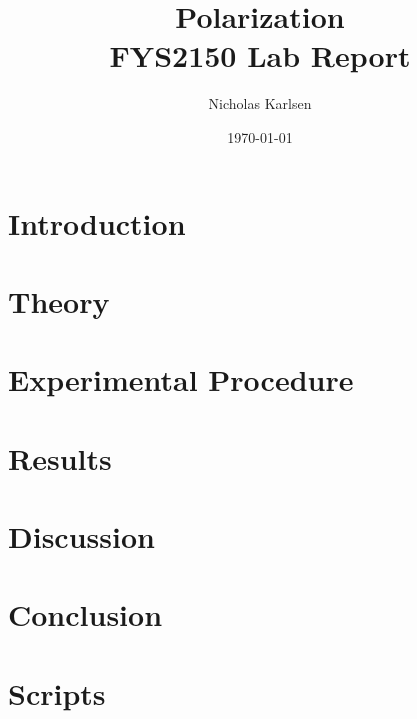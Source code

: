 \documentclass[11pt,a4paper]{article}
\begin{document}
\title{Polarization\\
\normalsize{FYS2150 Lab Report}\\}

\author{Nicholas Karlsen}

\date{\today}%

\maketitle

\begin{abstract}
\end{abstract}


\section{\label{sect:intro}Introduction}

\section{\label{sect:theory}Theory}

\section{\label{section:experimental}Experimental Procedure} 

\section{\label{sect:results}Results}

\section{\label{sect:discuss}Discussion}

\section{\label{sect:conclusion}Conclusion}



\newpage
\appendix
\section{Scripts\label{app:scripts}}
\end{document}
